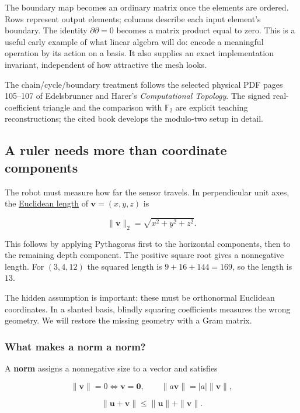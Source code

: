 The boundary map becomes an ordinary matrix once the elements are ordered. Rows represent output elements; columns describe each input element's boundary. The identity \(\partial\partial=0\) becomes a matrix product equal to zero. This is a useful early example of what linear algebra will do: encode a meaningful operation by its action on a basis. It also supplies an exact implementation invariant, independent of how attractive the mesh looks.

The chain/cycle/boundary treatment follows the selected physical PDF pages 105--107 of Edelsbrunner and Harer's \emph{Computational Topology}. The signed real-coefficient triangle and the comparison with \(\mathbb F_2\) are explicit teaching reconstructions; the cited book develops the modulo-two setup in detail.

\subsection{A ruler needs more than coordinate components}\label{a-ruler-needs-more-than-coordinate-components}

The robot must measure how far the sensor travels. In perpendicular unit axes, the \hyperref[01-foundations-i-ch017]{Euclidean length} of \(\mathbf v=(x,y,z)\) is

\[
\|\mathbf v\|_2=\sqrt{x^2+y^2+z^2}.
\]

This follows by applying Pythagoras first to the horizontal components, then to the remaining depth component. The positive square root gives a nonnegative length. For \((3,4,12)\) the squared length is \(9+16+144=169\), so the length is \(13\).

The hidden assumption is important: these must be orthonormal Euclidean coordinates. In a slanted basis, blindly squaring coefficients measures the wrong geometry. We will restore the missing geometry with a Gram matrix.

\subsubsection{What makes a norm a norm?}\label{what-makes-a-norm-a-norm}

A \textbf{norm} assigns a nonnegative size to a vector and satisfies

\[
\|\mathbf v\|=0\iff\mathbf v=\mathbf0,\qquad
\|a\mathbf v\|=|a|\|\mathbf v\|,
\]

\[
\|\mathbf u+\mathbf v\|\le\|\mathbf u\|+\|\mathbf v\|.
\]

